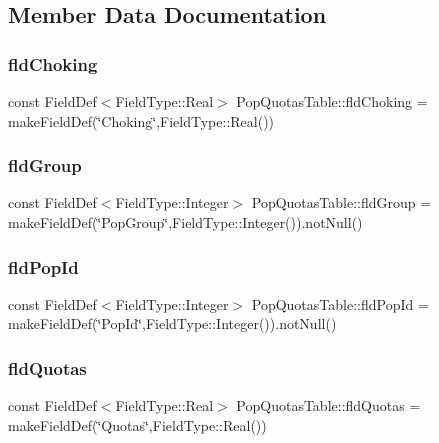 \subsection{Member Data Documentation}
\mbox{\label{class_pop_quotas_table_aba83cb577e0868d51e4f2d6c7c12427f}} 
\subsubsection{\texorpdfstring{fldChoking}{fldChoking}}
{\footnotesize\ttfamily const Field\+Def$<$Field\+Type\+::\+Real$>$ Pop\+Quotas\+Table\+::fld\+Choking = make\+Field\+Def(\char`\"{}Choking\char`\"{},Field\+Type\+::\+Real())}

\mbox{\label{class_pop_quotas_table_abde16e0cd8921f485613a30c363c55f9}} 
\subsubsection{\texorpdfstring{fldGroup}{fldGroup}}
{\footnotesize\ttfamily const Field\+Def$<$Field\+Type\+::\+Integer$>$ Pop\+Quotas\+Table\+::fld\+Group = make\+Field\+Def(\char`\"{}Pop\+Group\char`\"{},Field\+Type\+::\+Integer()).not\+Null()}

\mbox{\label{class_pop_quotas_table_a374b48f1c1d08d15f3a9b2be8e0f5ee1}} 
\subsubsection{\texorpdfstring{fldPopId}{fldPopId}}
{\footnotesize\ttfamily const Field\+Def$<$Field\+Type\+::\+Integer$>$ Pop\+Quotas\+Table\+::fld\+Pop\+Id = make\+Field\+Def(\char`\"{}Pop\+Id\char`\"{},Field\+Type\+::\+Integer()).not\+Null()}

\mbox{\label{class_pop_quotas_table_a6fd6c75e8c5965fd6eb23cf3ca04621e}} 
\subsubsection{\texorpdfstring{fldQuotas}{fldQuotas}}
{\footnotesize\ttfamily const Field\+Def$<$Field\+Type\+::\+Real$>$ Pop\+Quotas\+Table\+::fld\+Quotas = make\+Field\+Def(\char`\"{}Quotas\char`\"{},Field\+Type\+::\+Real())}

